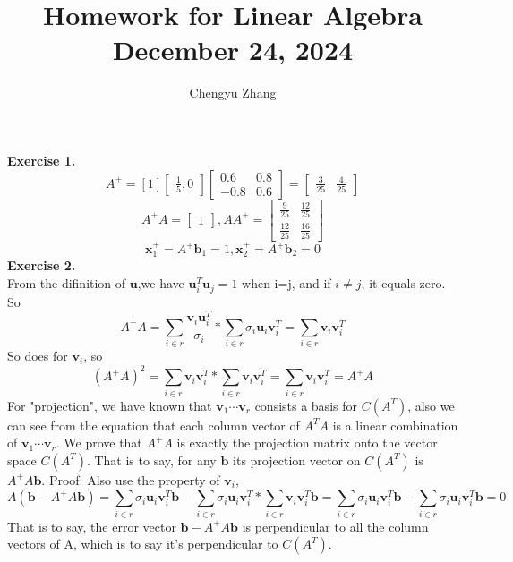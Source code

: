 \documentclass{article}
\title{\vspace*{-3.5cm}Homework for Linear Algebra \\December 24, 2024}
\author{Chengyu Zhang}
\date{}
\begin{document}
\maketitle
\textbf{Exercise 1.}\\
  \[
  A^+=[1]\begin{bmatrix}
    \frac{1}{5},0
  \end{bmatrix}\begin{bmatrix}
    0.6& 0.8\\
    -0.8&0.6
  \end{bmatrix}=\begin{bmatrix}
    \frac{3}{25}& \frac{4}{25}
  \end{bmatrix}
  \]
  \[
  A^+A=\begin{bmatrix}
    1
  \end{bmatrix}, AA^+=\begin{bmatrix}
    \frac{9}{25} & \frac{12}{25}\\
    \frac{12}{25} & \frac{16}{25}
  \end{bmatrix}
  \]
  \[
  \mathbf{x}^+_1=A^+\mathbf{b}_1=1,\mathbf{x}^+_2=A^+\mathbf{b}_2=0
  \]
\textbf{Exercise 2.}\\

From the difinition of $\mathbf{u}$,we have $\mathbf{u}_i^T\mathbf{u}_j=1$ when i=j, and if $i\neq j$, it equals zero. So 
\[
A^+A=\sum_{i\in r} \frac{\mathbf{v}_i\mathbf{u}_i^T}{\sigma_i}*\sum_{i\in r} \sigma_i\mathbf{u}_i\mathbf{v}_i^T=\sum_{i \in r}\mathbf{v}_i\mathbf{v}_i^T
\] 
So does for $\mathbf{v}_i$, so\[
(A^+A)^2=\sum_{i \in r}\mathbf{v}_i\mathbf{v}_i^T*\sum_{i \in r}\mathbf{v}_i\mathbf{v}_i^T=\sum_{i \in r}\mathbf{v}_i\mathbf{v}_i^T=A^+A
\]
For "projection", we have known that $\mathbf{v}_1\cdots \mathbf{v}_r$ consists a basis for $C(A^T)$, also we can see from the equation that each column vector of $A^TA$ is a linear combination of  $\mathbf{v}_1\cdots \mathbf{v}_r$.
 We prove that $A^+A$ is exactly the projection matrix onto the vector space $C(A^T)$.
That is to say, for any $\mathbf{b}$ its projection vector on $C(A^T)$ is $A^+A\mathbf{b}$.
Proof: Also use the property of $\mathbf{v}_i$,
\[
A(\mathbf{b}-A^+A\mathbf{b})=\sum_{i\in r} \sigma_i\mathbf{u}_i\mathbf{v}_i^T\mathbf{b}-\sum_{i\in r} \sigma_i\mathbf{u}_i\mathbf{v}_i^T*\sum_{i \in r}\mathbf{v}_i\mathbf{v}_i^T\mathbf{b}=\sum_{i\in r} \sigma_i\mathbf{u}_i\mathbf{v}_i^T\mathbf{b}-\sum_{i\in r} \sigma_i\mathbf{u}_i\mathbf{v}_i^T\mathbf{b}=0
\]
That is to say, the error vector $\mathbf{b}-A^+A\mathbf{b}$ is perpendicular to all the column vectors of A, which is to say it's perpendicular to $C(A^T)$.
\end{document}
